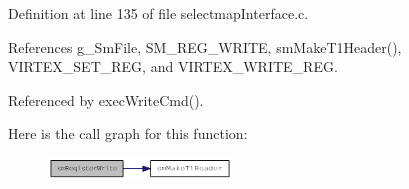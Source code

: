 Definition at line 135 of file selectmap\-Interface.c.

References g\_\-Sm\-File, SM\_\-REG\_\-WRITE, sm\-Make\-T1Header(), VIRTEX\_\-SET\_\-REG, and VIRTEX\_\-WRITE\_\-REG.

Referenced by exec\-Write\-Cmd().

Here is the call graph for this function:\begin{figure}[H]
\begin{center}
\leavevmode
\includegraphics[width=138pt]{group__selectmap__access_ge0d7561e2ddca5878fe0c39c948dfdd2_cgraph}
\end{center}
\end{figure}
